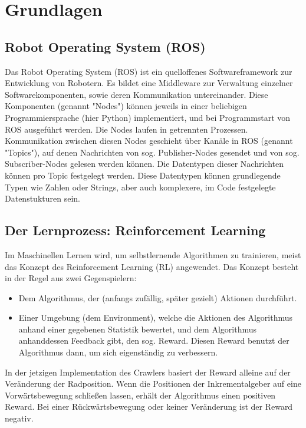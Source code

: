 \section{Grundlagen}


\subsection{Robot Operating System (ROS)}

Das Robot Operating System (ROS)\cite{ros} ist ein quelloffenes Softwareframework zur Entwicklung von Robotern. Es bildet eine Middleware zur Verwaltung einzelner Softwarekomponenten, sowie deren Kommunikation untereinander. Diese Komponenten (genannt "Nodes") können jeweils in einer beliebigen Programmiersprache (hier Python) implementiert, und bei Programmstart von ROS ausgeführt werden. Die Nodes laufen in getrennten Prozessen. Kommunikation zwischen diesen Nodes geschieht über Kanäle in ROS (genannt "Topics"), auf denen Nachrichten von sog. Publisher-Nodes gesendet und von sog. Subscriber-Nodes gelesen werden können. Die Datentypen dieser Nachrichten können pro Topic festgelegt werden. Diese Datentypen können grundlegende Typen wie Zahlen oder Strings, aber auch komplexere, im Code festgelegte Datenstukturen sein.

\subsection{Der Lernprozess: Reinforcement Learning}
\label{sec:reinforcement_learning}

Im Maschinellen Lernen wird, um selbstlernende Algorithmen zu trainieren, meist das Konzept des Reinforcement Learning (RL) angewendet. Das Konzept besteht in der Regel aus zwei Gegenspielern:
\begin{itemize}
    \item Dem Algorithmus, der (anfangs zufällig, später gezielt) Aktionen durchführt.
    \item Einer Umgebung (dem Environment), welche die Aktionen des Algorithmus anhand einer gegebenen Statistik bewertet, und dem Algorithmus anhanddessen Feedback gibt, den sog. Reward. Diesen Reward benutzt der Algorithmus dann, um sich eigenständig zu verbessern.
\end{itemize}

In der jetzigen Implementation des Crawlers basiert der Reward alleine auf der Veränderung der Radposition. Wenn die Positionen der Inkrementalgeber auf eine Vorwärtsbewegung schließen lassen, erhält der Algorithmus einen positiven Reward. Bei einer Rückwärtsbewegung oder keiner Veränderung ist der Reward negativ.

